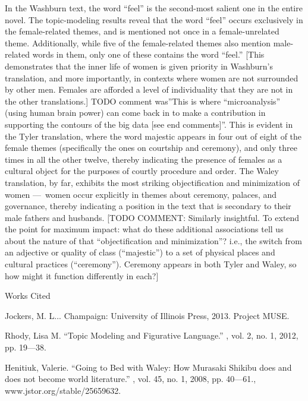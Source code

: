 \documentclass[12pt]{article}
\newcommand{\bibent}{\noindent \hangindent 40pt}
\newenvironment{workscited}{\newpage \begin{center} Works Cited \end{center}}{\newpage }
\begin{document}
\begin{flushleft}
\begin{spacing}{2.0}
In the Washburn text, the word ``feel'' is the second-most salient one in the entire novel. The topic-modeling results reveal that the word ``feel'' occurs exclusively in the female-related themes, and is mentioned not once in a female-unrelated theme. Additionally, while five of the female-related themes also mention male-related words in them, only one of these contains the word ``feel.'' [This demonstrates that the inner life of women is given priority in Washburn’s translation, and more importantly, in contexts where women are not surrounded by other men. Females are afforded a level of individuality that they are not in the other translations.] TODO comment was''This is where ``microanalysis'' (using human brain power) can come back in to make a contribution in supporting the contours of the big data [see end comments]''. This is evident in the Tyler translation, where the word majestic appears in four out of eight of the female themes (specifically the ones on courtship and ceremony), and only three times in all the other twelve, thereby indicating the presence of females as a cultural object for the purposes of courtly procedure and order. The Waley translation, by far, exhibits the most striking objectification and minimization of women --- women occur explicitly in themes about ceremony, palaces, and governance, thereby indicating a position in the text that is secondary to their male fathers and husbands. [TODO COMMENT: Similarly insightful. To extend the point for maximum impact: what do these additional associations tell us about the nature of that ``objectification and minimization''? i.e., the switch from an adjective or quality of class (``majestic'') to a set of physical places and cultural practices (``ceremony''). Ceremony appears in both Tyler and Waley, so how might it function differently in each?]

\begin{workscited}

\bibent Jockers, M. L... Champaign: University of Illinois Press, 2013. Project MUSE.

\bibent Rhody, Lisa M. ``Topic Modeling and Figurative Language.'' , vol. 2, no. 1, 2012, pp. 19---38.

\bibent Henitiuk, Valerie. ``Going to Bed with Waley: How Murasaki Shikibu does and does not become world literature.'' , vol. 45, no. 1, 2008, pp. 40---61., www.jstor.org/stable/25659632.


\end{workscited}
\end{spacing}
\end{flushleft}
\end{document}
